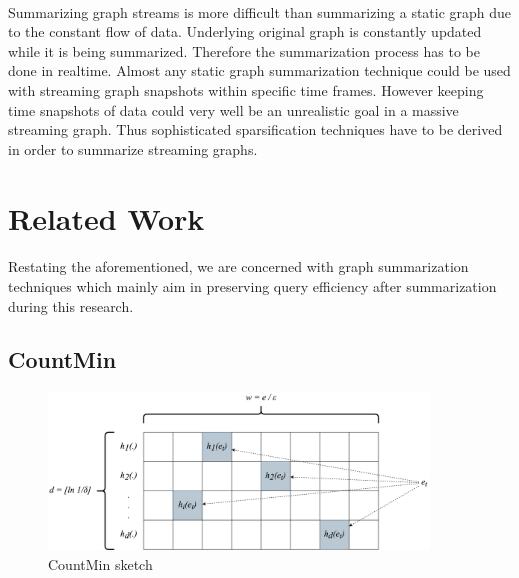 \paragraph{}
Summarizing graph streams is more difficult than summarizing a static graph due to the constant flow of data. Underlying original graph is constantly updated while it is being summarized. Therefore the summarization process has to be done in realtime. Almost any static graph summarization technique could be used with streaming graph snapshots within specific time frames. However keeping time snapshots of data could very well be an unrealistic goal in a massive streaming graph. Thus sophisticated sparsification techniques have to be derived in order to summarize streaming graphs. 

\section{Related Work}

\paragraph{}
Restating the aforementioned, we are concerned with graph summarization techniques which mainly aim in preserving query efficiency after summarization during this research. 

\subsection{CountMin}

\begin{figure}[H]
    \centering
    \includegraphics[width=0.9\textwidth]{images/countmin}
    \caption{CountMin sketch}
    \label{figure:countmin}
\end{figure}

